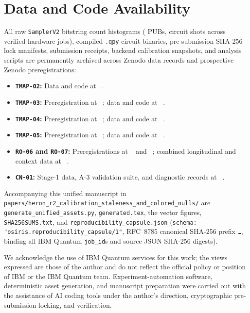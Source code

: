 \documentclass[twocolumn,aps,prapplied,superscriptaddress,floatfix]{revtex4-2}
\begin{document}
\section{Data and Code Availability}\label{sec:data}

All raw \texttt{SamplerV2} bitstring count histograms (\TotalPubs{} PUBs, \TotalShots{} circuit shots across \TotalJobs{} verified hardware jobs), compiled \texttt{.qpy} circuit binaries, pre-submission SHA-256 lock manifests, submission receipts, backend calibration snapshots, and analysis scripts are permanently archived across \NumZenodoLetters{} Zenodo data records and \NumZenodoPreregs{} prospective Zenodo preregistrations:
\begin{itemize}
\item \textbf{\texttt{TMAP-02}:} Data and code at \texttt{\DoiTmapTwo}~\cite{davis_tmap02}.
\item \textbf{\texttt{TMAP-03}:} Preregistration at \texttt{\DoiTmapThreePrereg}~\cite{prereg_tmap03}; data and code at \texttt{\DoiTmapThree}~\cite{davis_tmap03}.
\item \textbf{\texttt{TMAP-04}:} Preregistration at \texttt{\DoiTmapFourPrereg}~\cite{prereg_tmap04}; data and code at \texttt{\DoiTmapFour}~\cite{davis_tmap04}.
\item \textbf{\texttt{TMAP-05}:} Preregistration at \texttt{\DoiTmapFivePrereg}~\cite{prereg_tmap05}; data and code at \texttt{\DoiTmapFive}~\cite{davis_tmap05}.
\item \textbf{\texttt{RO-06} and \texttt{RO-07}:} Preregistrations at \texttt{\DoiRoSixPrereg}~\cite{prereg_ro06} and \texttt{\DoiRoSevenPrereg}~\cite{prereg_ro07}; combined longitudinal and context data at \texttt{\DoiRoSixSeven}~\cite{davis_ro0607}.
\item \textbf{\texttt{CN-01}:} Stage-1 data, A-3 validation suite, and diagnostic records at \texttt{\DoiCnZeroOne}~\cite{davis_cn01}.
\end{itemize}
Accompanying this unified manuscript in \texttt{papers/heron\_r2\_calibration\_staleness\_and\_colored\_nulls/} are \texttt{generate\_unified\_assets.py}, \texttt{generated.tex}, the vector figures, \texttt{SHA256SUMS.txt}, and \texttt{reproducibility\_capsule.json} (\texttt{schema: "osiris.reproducibility\_capsule/1"}, RFC~8785 canonical SHA-256 prefix \texttt{\CapsuleRfcShaPrefix\ldots}, binding all \TotalJobs{} IBM Quantum \texttt{job\_id}s and \CapsuleSourceCount{} source JSON SHA-256 digests).

\begin{acknowledgments}
We acknowledge the use of IBM Quantum services for this work; the views expressed are those of the author and do not reflect the official policy or position of IBM or the IBM Quantum team. Experiment-automation software, deterministic asset generation, and manuscript preparation were carried out with the assistance of AI coding tools under the author's direction, cryptographic pre-submission locking, and verification.
\end{acknowledgments}
\end{document}
